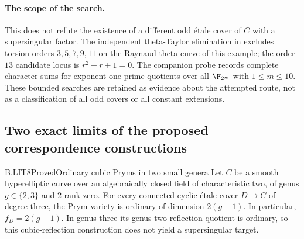 \paragraph{The scope of the search.}
This does not refute the existence of a different odd
\'etale cover of $C$ with a supersingular factor. The
independent theta-Taylor elimination in
 excludes torsion orders
$3,5,7,9,11$ on the Raynaud theta curve of this example;
the order-$13$ candidate locus is $r^2+r+1=0$.
The companion probe records complete character sums
for exponent-one prime quotients over all
$\F_{2^m}$ with $1\le m\le10$. These bounded searches
are retained as evidence about the attempted route,
not as a classification of all odd covers or all
constant extensions.

\subsection{Two exact limits of the proposed correspondence constructions}

\begin{claim}{B.LIT8}{Proved}{Ordinary cubic Pryms in two small genera}
Let $C$ be a smooth hyperelliptic curve over an algebraically
closed field of characteristic two, of genus $g\in\{2,3\}$
and $2$-rank zero. For every connected cyclic \'etale
cover $D\to C$ of degree three, the Prym variety is
ordinary of dimension $2(g-1)$. In particular,
$f_D=2(g-1)$. In genus three its genus-two reflection
quotient is ordinary, so this cubic-reflection construction
does not yield a supersingular target.
\end{claim}

